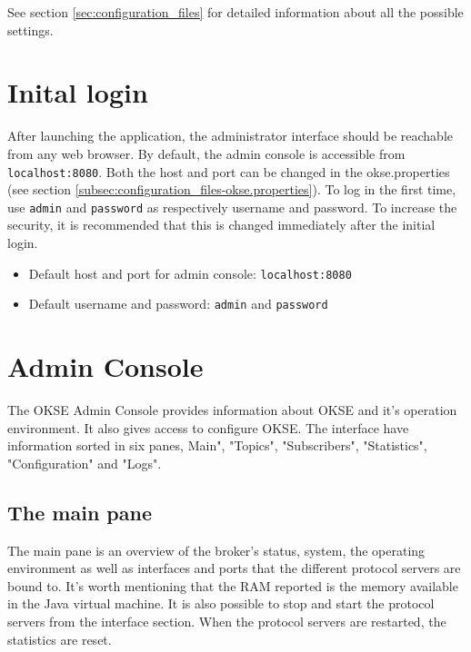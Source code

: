 \noindent See section \ref{sec:configuration_files} for detailed information about all the possible settings.

\section{Inital login}
\label{sec:inital-login}

After launching the application, the administrator interface should be reachable from any web browser. By default, the admin console is accessible from \verb!localhost:8080!. Both the host and port can be changed in the okse.properties (see section \ref{subsec:configuration_files-okse.properties}). To log in the first time, use \verb!admin! and \verb!password! as respectively username and password. To increase the security, it is recommended that this is changed immediately after the initial login. 

\begin{itemize}
\setlength{\itemsep}{0cm}%
\item Default host and port for admin console: \verb!localhost:8080!
\item Default username and password: \verb!admin! and \verb!password!
\end{itemize}

\section{Admin Console}
The OKSE Admin Console provides information about OKSE and it's operation environment. It also gives access to configure OKSE. The interface have information sorted in six panes, Main", "Topics", "Subscribers", "Statistics", "Configuration" and "Logs".

\subsection{The main pane}
The main pane is an overview of the broker's status, system, the operating environment as well as interfaces and ports that the different protocol servers are bound to. It's worth mentioning that the RAM reported is the memory available in the Java virtual machine. It is also possible to stop and start the protocol servers from the interface section. When the protocol servers are restarted, the statistics are reset.

